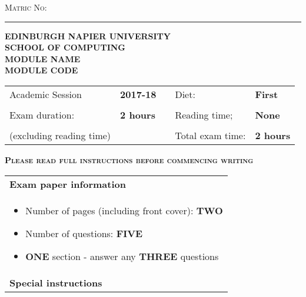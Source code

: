 \documentclass[12pt, a4paper, twosize]{article}
\newcommand{\blank}[1]{\hspace*{#1}}
\newcommand*{\inputline}[1][3em]{\rule[0.5ex]{#1}{0.55pt}}
\begin{document}
\begin{titlepage}
\vspace*{1cm}

\textsc{Matric No:} \inputline[10em]

\begin{center}

\textsc{\Large {\bf{EDINBURGH NAPIER UNIVERSITY}}}\\[0.5cm]
\textsc{\Large {\bf{SCHOOL OF COMPUTING}}}\\[1.5cm]


\textsc{\Large {\bf{MODULE NAME}}}\\[1cm]
\textsc{\Large {\bf{MODULE CODE}}}\\[1.5cm]

\end{center}

\begin{table}[H]
\centering
\begin{tabular}{lllll}
Academic Session         & \textbf{2017-18} &  \blank{2cm} & Diet:& \textbf{First}   \\
     & & & \\
Exam duration:           & \textbf{2 hours} &  & Reading time;    & \textbf{None}    \\
     & & & \\
(excluding reading time) &                  &  & Total exam time: & \textbf{2 hours}
\end{tabular}
\end{table}

\vspace{2cm}
\textsc{{\bf{Please read full instructions before commencing writing}}}

\begin{table}[H]
\centering
\begin{tabular}{|p{14cm}|}
\hline

{\bf{Exam paper information}}\\

    \begin{itemize}
      \item Number of pages (including front cover): {\bf{TWO}}
      \item Number of questions: {\bf{FIVE}}
      \item {\bf{ONE}} section - answer any {\bf{THREE}} questions
    \end{itemize} \\

\hline
{\bf{Special instructions}}\\


\end{tabular}
\end{table}
\end{titlepage}
\end{document}
